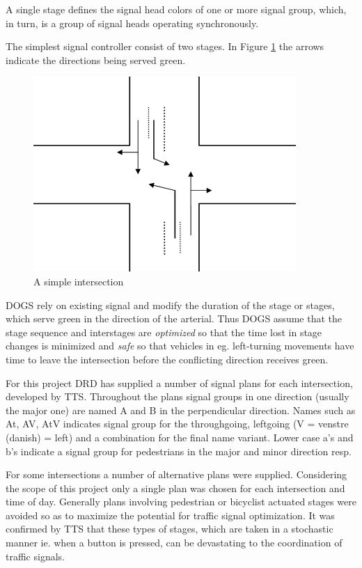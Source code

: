 A single stage defines the signal head colors of one or more signal group, which, in turn, is a group of signal heads operating synchronously.

The simplest signal controller consist of two stages. In  Figure \ref{fig:simple_intersection} the arrows indicate the directions being served green.

\begin{figure}[!ht]
\begin{center}
\includegraphics[scale=0.5]{simple_intersection.png} 
\end{center}
\caption{A simple intersection}
\label{fig:simple_intersection}
\end{figure}

DOGS rely on existing signal and modify the duration of the stage or stages, which serve green in the direction of the arterial. Thus DOGS assume that the stage sequence and interstages are \textit{optimized} so that the time lost in stage changes is minimized and \textit{safe} so that vehicles in eg. left-turning movements have time to leave the intersection before the conflicting direction receives green.

For this project DRD has supplied a number of signal plans for each intersection, developed by TTS. Throughout the plans signal groups in one direction (usually the major one) are named A and B in the perpendicular direction. Names such as At, AV, AtV indicates signal group for the throughgoing, leftgoing (V = venstre (danish) = left) and a combination for the final name variant. Lower case a's and b's indicate a signal group for pedestrians in the major and minor direction resp.

For some intersections a number of alternative plans were supplied. Considering the scope of this project only a single plan was chosen for each intersection and time of day. Generally plans involving pedestrian or bicyclist actuated stages were avoided so as to maximize the potential for traffic signal optimization. It was confirmed by TTS that these types of stages, which are taken in a stochastic manner ie. when a button is pressed, can be devastating to the coordination of traffic signals.

